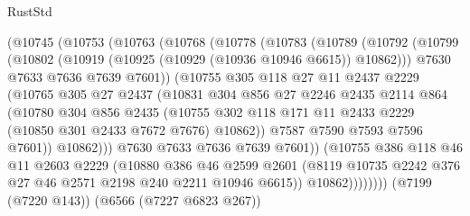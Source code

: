 \begin{lexlean}{RustStd}
\begin{coremodule}
{\begin{coremodule}
{{{{{{{{{{{{{{{{{{{{{{{{{{            (@10745
              (@10753
                (@10763
                  (@10768
                    (@10778
                      (@10783
                        (@10789
                          (@10792
                            (@10799
                              (@10802 (@10919 (@10925 (@10929 (@10936 @10946 @6615)) @10862)))
                              @7630
                              @7633
                              @7636
                              @7639
                              @7601))
                          (@10755
                            @305
                            @118
                            @27
                            @11
                            @2437
                            @2229
                            (@10765
                              @305
                              @27
                              @2437
                              (@10831
                                @304
                                @856
                                @27
                                @2246
                                @2435
                                @2114
                                @864
                                (@10780
                                  @304
                                  @856
                                  @2435
                                  (@10755
                                    @302
                                    @118
                                    @171
                                    @11
                                    @2433
                                    @2229
                                    (@10850 @301 @2433 @7672 @7676)
                                    @10862))
                                @7587
                                @7590
                                @7593
                                @7596
                                @7601))
                            @10862)))
                      @7630
                      @7633
                      @7636
                      @7639
                      @7601))
                  (@10755
                    @386
                    @118
                    @46
                    @11
                    @2603
                    @2229
                    (@10880
                      @386
                      @46
                      @2599
                      @2601
                      (@8119 @10735 @2242 @376 @27 @46 @2571 @2198 @240 @2211 @10946 @6615))
                    @10862))))))))
    (@7199 (@7220 @143))
    (@6566 (@7227 @6823 @267))
}}}}}}}}}}}}}}}}}}}}}}}}}}
\end{coremodule}}
\end{coremodule}
\end{lexlean}
